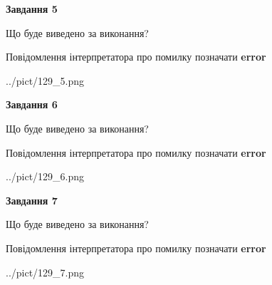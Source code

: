 \documentclass[10pt, ukrainian]{article}
\begin{document}
{\begin {large}
{\begin {center}\textbf{Завдання 5}\end {center}}\par
Що буде виведено за виконання? \par
Повідомлення інтерпретатора про помилку позначати \textbf{error}

\begin{center}
	{../pict/129_5.png}
\end{center}
\newpage

{\begin {center}\textbf{Завдання 6}\end {center}}\par
Що буде виведено за виконання? \par
Повідомлення інтерпретатора про помилку позначати \textbf{error}

\begin{center}
	{../pict/129_6.png}
\end{center}
\newpage

{\begin {center}\textbf{Завдання 7}\end {center}}\par
Що буде виведено за виконання? \par
Повідомлення інтерпретатора про помилку позначати \textbf{error}

\begin{center}
	{../pict/129_7.png}
\end{center}
\newpage

\end {large}}
\end{document}
